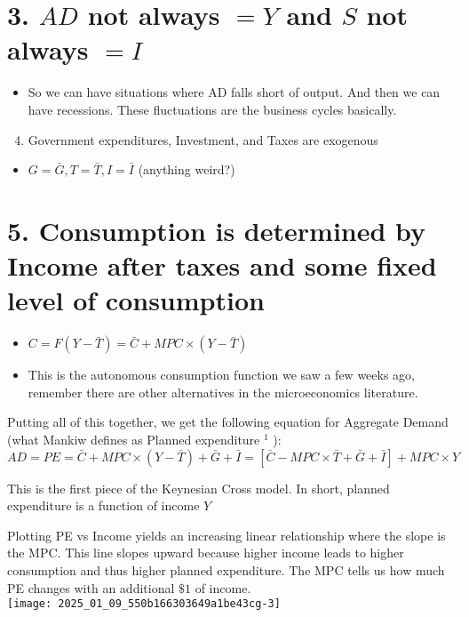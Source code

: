 \documentclass[10pt]{article}
\begin{document}
\section*{3. $A D$ not always $=Y$ and $S$ not always $=I$}
\begin{itemize}
  \item So we can have situations where AD falls short of output. And then we can have recessions. These fluctuations are the business cycles basically.
\end{itemize}

\begin{enumerate}
  \setcounter{enumi}{3}
  \item Government expenditures, Investment, and Taxes are exogenous
\end{enumerate}

\begin{itemize}
  \item $G=\bar{G}, T=\bar{T}, I=\bar{I}$ (anything weird?)
\end{itemize}

\section*{5. Consumption is determined by Income after taxes and some fixed level of consumption}
\begin{itemize}
  \item $C=F(Y-\bar{T})=\bar{C}+M P C \times(Y-\bar{T})$
  \item This is the autonomous consumption function we saw a few weeks ago, remember there are other alternatives in the microeconomics literature.
\end{itemize}

Putting all of this together, we get the following equation for Aggregate Demand (what Mankiw defines as Planned expenditure ${ }^{1}$ ):\\
$A D=P E=\bar{C}+M P C \times(Y-\bar{T})+\bar{G}+\bar{I}=[\bar{C}-M P C \times \bar{T}+\bar{G}+\bar{I}]+M P C \times Y$

This is the first piece of the Keynesian Cross model. In short, planned expenditure is a function of income $Y$

Plotting PE vs Income yields an increasing linear relationship where the slope is the MPC. This line slopes upward because higher income leads to higher consumption and thus higher planned expenditure. The MPC tells us how much PE changes with an additional $\$ 1$ of income.\\
\texttt{[image: 2025\_01\_09\_550b166303649a1be43cg-3]}
\end{document}
